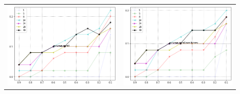 \documentclass{article}
\begin{document}
\begin{table}[h!]
\begin{tabular}{p{0.45\linewidth}p{0.45\linewidth}}
            \includegraphics[width=\linewidth]{m} & \includegraphics[width=\linewidth]{m_non_binary}\\ 

\end{tabular}
\end{table}
\end{document}
